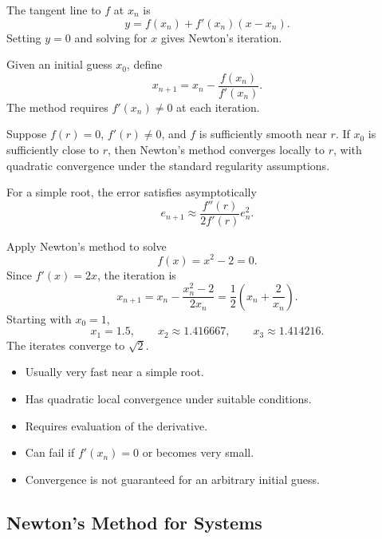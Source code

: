The tangent line to \(f\) at \(x_n\) is
\[
  y=f(x_n)+f'(x_n)(x-x_n).
\]
Setting \(y=0\) and solving for \(x\) gives Newton's iteration.

\begin{definition}
  Given an initial guess \(x_0\), define
  \[
    \boxed{
      x_{n+1}=x_n-\frac{f(x_n)}{f'(x_n)}.
    }
  \]
  The method requires \(f'(x_n)\neq0\) at each iteration.
\end{definition}

\begin{theorem}
  Suppose \(f(r)=0\), \(f'(r)\neq0\), and \(f\) is sufficiently smooth near \(r\). If \(x_0\) is sufficiently close to \(r\), then Newton's method converges locally to \(r\), with quadratic convergence under the standard regularity assumptions.
\end{theorem}

For a simple root, the error satisfies asymptotically
\[
  \boxed{
    e_{n+1}\approx
    \frac{f''(r)}{2f'(r)}e_n^2.
  }
\]

\begin{example}
  Apply Newton's method to solve
  \[
    f(x)=x^2-2=0.
  \]
  Since \(f'(x)=2x\), the iteration is
  \[
    x_{n+1}=x_n-\frac{x_n^2-2}{2x_n}
    =\frac12\left(x_n+\frac{2}{x_n}\right).
  \]
  Starting with \(x_0=1\),
  \[
    x_1=1.5,\qquad
    x_2\approx1.416667,\qquad
    x_3\approx1.414216.
  \]
  The iterates converge to \(\sqrt{2}\).
\end{example}

\begin{remark}
  \begin{itemize} \emph{}
    \item Usually very fast near a simple root.
    \item Has quadratic local convergence under suitable conditions.
    \item Requires evaluation of the derivative.
    \item Can fail if \(f'(x_n)=0\) or becomes very small.
    \item Convergence is not guaranteed for an arbitrary initial guess.
  \end{itemize}
\end{remark}

\subsection{Newton's Method for Systems}

